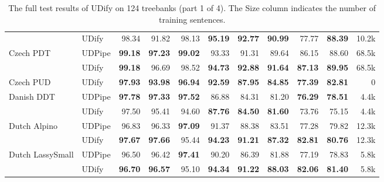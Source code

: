 \documentclass[11pt,a4paper]{article}
\begin{document}
\begin{table*}
\begin{center}
\begin{tabular}{@{}llrrrrrrrrr@{}}
               & UDify &      98.34 &      91.82 &       98.13 &  \bf 95.19 &  \bf 92.77 &  \bf 90.99 &      77.77 &  \bf 88.39 &  10.2k \\
    \addlinespace
    Czech PDT & UDPipe &  \bf 99.18 &  \bf 97.23 &   \bf 99.02 &      93.33 &      91.31 &      89.64 &      86.15 &      88.60 &  68.5k \\
               & UDify &  \bf 99.18 &      96.69 &       98.52 &  \bf 94.73 &  \bf 92.88 &  \bf 91.64 &  \bf 87.13 &  \bf 89.95 &  68.5k \\
    \addlinespace
    Czech PUD & UDify &  \bf 97.93 &  \bf 93.98 &   \bf 96.94 &  \bf 92.59 &  \bf 87.95 &  \bf 84.85 &  \bf 77.39 &  \bf 82.81 &      0 \\
    \addlinespace
    Danish DDT & UDPipe &  \bf 97.78 &  \bf 97.33 &   \bf 97.52 &      86.88 &      84.31 &      81.20 &  \bf 76.29 &  \bf 78.51 &   4.4k \\
               & UDify &      97.50 &      95.41 &       94.60 &  \bf 87.76 &  \bf 84.50 &  \bf 81.60 &      73.76 &      75.15 &   4.4k \\
    \addlinespace
    Dutch Alpino & UDPipe &      96.83 &      96.33 &   \bf 97.09 &      91.37 &      88.38 &      83.51 &      77.28 &      79.82 &  12.3k \\
               & UDify &  \bf 97.67 &  \bf 97.66 &       95.44 &  \bf 94.23 &  \bf 91.21 &  \bf 87.32 &  \bf 82.81 &  \bf 80.76 &  12.3k \\
    \addlinespace
    Dutch LassySmall & UDPipe &      96.50 &      96.42 &   \bf 97.41 &      90.20 &      86.39 &      81.88 &      77.19 &      78.83 &   5.8k \\
               & UDify &  \bf 96.70 &  \bf 96.57 &       95.10 &  \bf 94.34 &  \bf 91.22 &  \bf 88.03 &  \bf 82.06 &  \bf 81.40 &   5.8k \\
    \bottomrule
    \end{tabular}
    \end{center}
    \caption{\label{table:full-results-1} The full test results of UDify on 124 treebanks (part 1 of 4). The {\sc Size} column indicates the number of training sentences.}
\end{table*}
\end{document}

